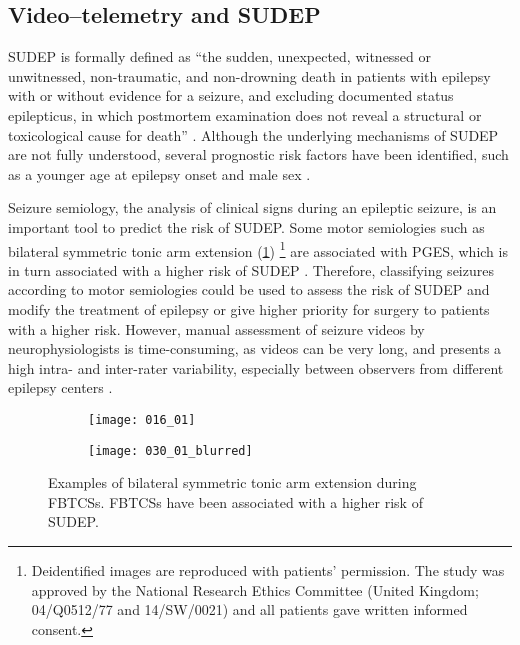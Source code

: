 \subsection{Video--telemetry and SUDEP}

\acs{SUDEP} is formally defined as ``the sudden, unexpected, witnessed or unwitnessed, non-traumatic, and non-drowning death in patients with epilepsy with or without evidence for a seizure, and excluding documented status epilepticus, in which postmortem examination does not reveal a structural or toxicological cause for death'' \cite{nashef_sudden_1997}.
Although the underlying mechanisms of \ac{SUDEP} are not fully understood, several prognostic risk factors have been identified, such as a younger age at epilepsy onset and male sex \cite{so_what_2008,jha_sudden_2021}.

Seizure semiology, the analysis of clinical signs during an epileptic seizure, is an important tool to predict the risk of \ac{SUDEP}.
Some motor semiologies such as bilateral symmetric tonic arm extension (\cref{fig:decerebration})%
\footnote{Deidentified images are reproduced with patients' permission. The study was approved by the National Research Ethics Committee (United Kingdom; 04/Q0512/77 and 14/SW/0021) and all patients gave written informed consent.} %
are associated with \ac{PGES}, which is in turn associated with a higher risk of \ac{SUDEP} \cite{alexandre_risk_2015,vilella_association_2021}.
Therefore, classifying seizures according to motor semiologies could be used to assess the risk of \ac{SUDEP} and modify the treatment of epilepsy or give higher priority for surgery to patients with a higher risk.
However, manual assessment of seizure videos by neurophysiologists is time-consuming, as videos can be very long, and presents a high intra- and inter-rater variability, especially between observers from different epilepsy centers \cite{tufenkjian_seizure_2012}.

\begin{figure}
  \centering

  \begin{subfigure}{0.49\linewidth}
    \texttt{[image: 016\_01]}
  \end{subfigure}
  \begin{subfigure}{0.49\linewidth}
    \texttt{[image: 030\_01\_blurred]}
  \end{subfigure}
  \caption[Examples of bilateral symmetric tonic arm extension]{
    Examples of bilateral symmetric tonic arm extension during \acfp*{FBTCS}.
    \acsp{FBTCS} have been associated with a higher risk of \acf*{SUDEP}.
  }
  \label{fig:decerebration}
\end{figure}

